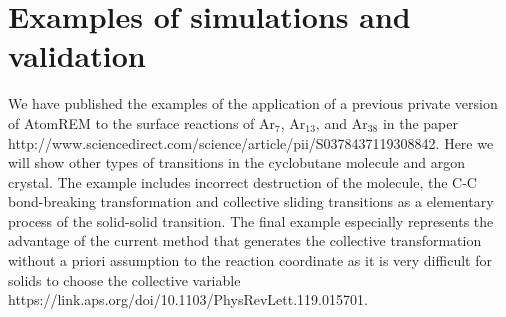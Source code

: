 \documentclass[preprint,12pt]{elsarticle}
\begin{document}



\newpage

\section{Examples of simulations and validation}
\label{sec:examples}

We have published the examples of the application of a previous private version of AtomREM to the surface reactions of Ar$_7$, Ar$_{13}$, and Ar$_{38}$ in the paper http://www.sciencedirect.com/science/article/pii/S0378437119308842. Here we will show other types of transitions in the cyclobutane molecule and argon crystal. The example includes incorrect destruction of the molecule, the C-C bond-breaking transformation and collective sliding transitions as a elementary process of the solid-solid transition. The final example especially represents the advantage of the current method that generates the collective transformation without a priori assumption to the reaction coordinate as it is very difficult for solids to choose the collective variable https://link.aps.org/doi/10.1103/PhysRevLett.119.015701.


\end{document}
